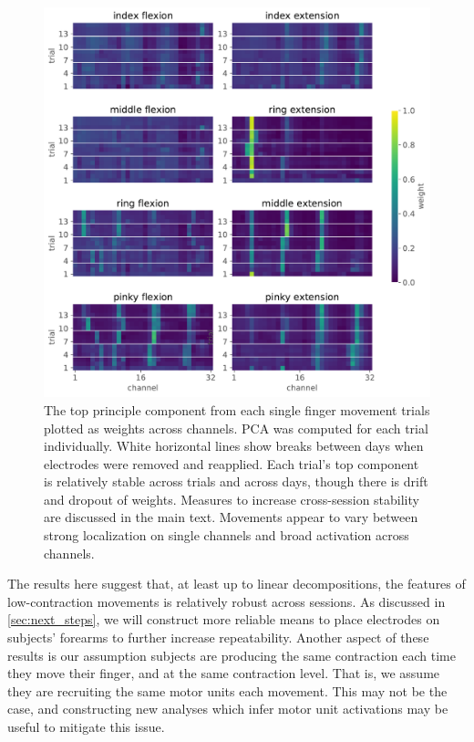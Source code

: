 \documentclass[
  a4paper,
]{article}
\begin{document}
\begin{figure}
\hypertarget{fig:PCA_components}{%
\centering
\includegraphics[width=1\textwidth,height=\textheight]{images/data_analysis/fingers/PCA_components.pdf}
\caption{The top principle component from each single finger movement
trials plotted as weights across channels. PCA was computed for each
trial individually. White horizontal lines show breaks between days when
electrodes were removed and reapplied. Each trial's top component is
relatively stable across trials and across days, though there is drift
and dropout of weights. Measures to increase cross-session stability are
discussed in the main text. Movements appear to vary between strong
localization on single channels and broad activation across
channels.}\label{fig:PCA_components}
}
\end{figure}

The results here suggest that, at least up to linear decompositions, the
features of low-contraction movements is relatively robust across
sessions. As discussed in \cref{sec:next_steps}, we will construct more
reliable means to place electrodes on subjects' forearms to further
increase repeatability. Another aspect of these results is our
assumption subjects are producing the same contraction each time they
move their finger, and at the same contraction level. That is, we assume
they are recruiting the same motor units each movement. This may not be
the case, and constructing new analyses which infer motor unit
activations may be useful to mitigate this issue.
\end{document}

